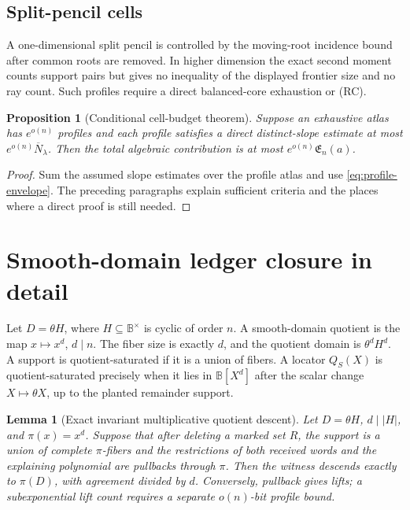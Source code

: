 \documentclass[12pt,a4paper]{amsart}
\numberwithin{equation}{section}
\newtheorem{proposition}[proposition]{Proposition}
\newtheorem{lemma}[lemma]{Lemma}
\theoremstyle{remark}
\newcommand{\B}{\mathbb B}
\newcommand{\barN}{\overline N}
\newcommand{\abs}[1]{\lvert #1\rvert}
\begin{document}
\subsection*{Split-pencil cells}
A one-dimensional split pencil is controlled by the moving-root incidence
bound after common roots are removed.  In higher dimension the exact
second moment counts support pairs but gives no inequality of the displayed
frontier size and no ray count.  Such profiles require a direct
balanced-core exhaustion or \textup{(RC)}.

\begin{proposition}[Conditional cell-budget theorem]\label{prop:cell-budget-theorem}
Suppose an exhaustive atlas has \(e^{o(n)}\) profiles and each profile
satisfies a direct distinct-slope estimate at most
\(e^{o(n)}\barN_\lambda\).  Then the total algebraic contribution is at
most \(e^{o(n)}\mathfrak E_n(a)\).
\end{proposition}

\begin{proof}
Sum the assumed slope estimates over the profile atlas and use
\eqref{eq:profile-envelope}.  The preceding paragraphs explain sufficient
criteria and the places where a direct proof is still needed.
\end{proof}

\section{Smooth-domain ledger closure in detail}\label{sec:smooth-domain-detail}

Let \(D=\theta H\), where \(H\subseteq\B^\times\) is cyclic of order \(n\).  A smooth-domain quotient is the map \(x\mapsto x^d\), \(d\mid n\).  The fiber size is exactly \(d\), and the quotient domain is \(\theta^dH^d\).  A support is quotient-saturated if it is a union of fibers.  A locator \(Q_S(X)\) is quotient-saturated precisely when it lies in \(\B[X^d]\) after the scalar change \(X\mapsto \theta X\), up to the planted remainder support.

\begin{lemma}[Exact invariant multiplicative quotient descent]\label{lem:exact-multiplicative-descent}
Let \(D=\theta H\), \(d\mid\abs H\), and \(\pi(x)=x^d\).  Suppose that
after deleting a marked set \(R\), the support is a union of complete
\(\pi\)-fibers and the restrictions of both received words and the
explaining polynomial are pullbacks through \(\pi\).  Then the witness
descends exactly to \(\pi(D)\), with agreement divided by \(d\).
Conversely, pullback gives lifts; a subexponential lift count requires a
separate \(o(n)\)-bit profile bound.
\end{lemma}
\end{document}

